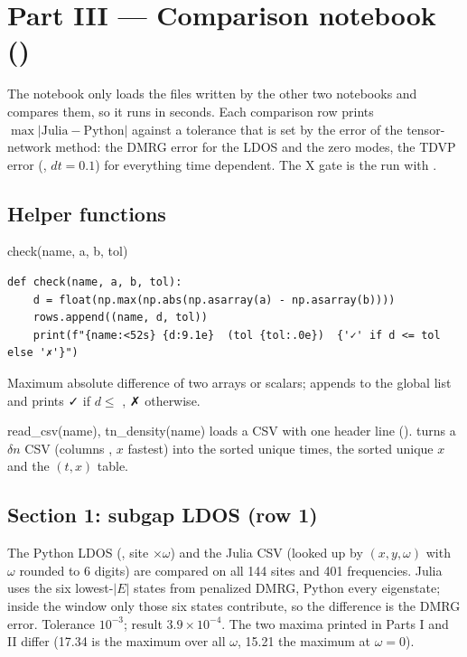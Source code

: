 \section{Part III --- Comparison notebook ()}

The notebook only loads the files written by the other two notebooks and compares them, so it runs in seconds. Each comparison row prints
$\max|\text{Julia} - \text{Python}|$ against a tolerance that is set by the error of the tensor-network method: the DMRG error for the LDOS
and the zero modes, the TDVP error (, $dt = 0.1$) for everything time dependent. The X gate is the run with
.

\subsection{Helper functions}

\begin{function}{check(name, a, b, tol)}
\begin{Verbatim}
def check(name, a, b, tol):
    d = float(np.max(np.abs(np.asarray(a) - np.asarray(b))))
    rows.append((name, d, tol))
    print(f"{name:<52s} {d:9.1e}  (tol {tol:.0e})  {'✓' if d <= tol else '✗'}")
\end{Verbatim}
Maximum absolute difference of two arrays or scalars; appends  to the global list  and prints ✓ if
$d\le$ , ✗ otherwise.
\end{function}

\begin{function}{read\_csv(name), tn\_density(name)}
 loads a CSV with one header line ().  turns a $\delta n$ CSV (columns , $x$
fastest) into the sorted unique times, the sorted unique $x$ and the $(t, x)$ table.
\end{function}

\subsection{Section 1: subgap LDOS (row 1)}

The Python LDOS (, site $\times\omega$) and the Julia CSV (looked up by $(x, y, \omega)$ with $\omega$ rounded to
6 digits) are compared on all 144 sites and 401 frequencies. Julia uses the six lowest-$|E|$ states from penalized DMRG, Python every
eigenstate; inside the window only those six states contribute, so the difference is the DMRG error. Tolerance $10^{-3}$; result
$3.9\times10^{-4}$. The two maxima printed in Parts I and II differ (17.34 is the maximum over all $\omega$, 15.21 the maximum at $\omega = 0$).

